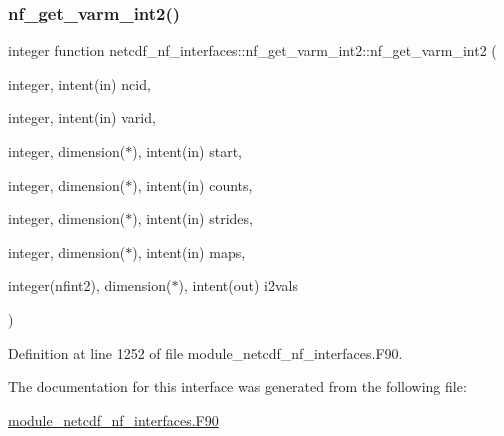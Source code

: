 \subsubsection{\texorpdfstring{nf\+\_\+get\+\_\+varm\+\_\+int2()}{nf\_get\_varm\_int2()}}
{\footnotesize\ttfamily integer function netcdf\+\_\+nf\+\_\+interfaces\+::nf\+\_\+get\+\_\+varm\+\_\+int2\+::nf\+\_\+get\+\_\+varm\+\_\+int2 (\begin{DoxyParamCaption}\item[{integer, intent(in)}]{ncid,  }\item[{integer, intent(in)}]{varid,  }\item[{integer, dimension($\ast$), intent(in)}]{start,  }\item[{integer, dimension($\ast$), intent(in)}]{counts,  }\item[{integer, dimension($\ast$), intent(in)}]{strides,  }\item[{integer, dimension($\ast$), intent(in)}]{maps,  }\item[{integer(nfint2), dimension($\ast$), intent(out)}]{i2vals }\end{DoxyParamCaption})}



Definition at line 1252 of file module\+\_\+netcdf\+\_\+nf\+\_\+interfaces.\+F90.



The documentation for this interface was generated from the following file\+:\begin{DoxyCompactItemize}
\item 
\hyperlink{module__netcdf__nf__interfaces_8F90}{module\+\_\+netcdf\+\_\+nf\+\_\+interfaces.\+F90}\end{DoxyCompactItemize}
